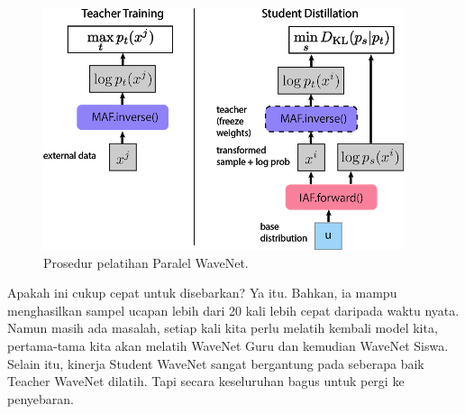 \begin{figure}[H]
        \centerline{\includegraphics[scale=.5]{figures/rumus14}}
        \caption{Prosedur pelatihan Paralel WaveNet.}
		\label{rumus14}
\end{figure}

Apakah ini cukup cepat untuk disebarkan? Ya itu. Bahkan, ia mampu menghasilkan sampel ucapan lebih dari 20 kali lebih cepat daripada waktu nyata. Namun masih ada masalah, setiap kali kita perlu melatih kembali model kita, pertama-tama kita akan melatih WaveNet Guru dan kemudian WaveNet Siswa. Selain itu, kinerja Student WaveNet sangat bergantung pada seberapa baik Teacher WaveNet dilatih. Tapi secara keseluruhan bagus untuk pergi ke penyebaran.